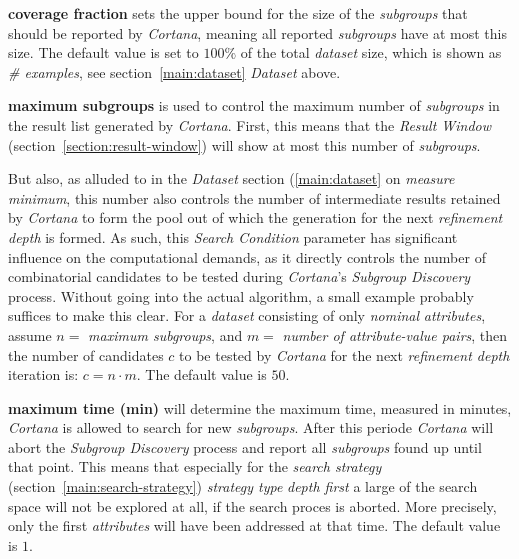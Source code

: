 \documentclass{article}
\begin{document}
\textbf{coverage fraction} sets the upper bound for the size of the \emph{subgroups} that should be reported by \emph{Cortana}, meaning all reported \emph{subgroups} have at most this size.
The default value is set to $100\%$ of the total \emph{dataset} size, which is shown as \emph{\# examples}, see section~\ref{main:dataset} \emph{Dataset} above.

\textbf{maximum subgroups} is used to control the maximum number of \emph{subgroups} in the result list generated by \emph{Cortana}.
First, this means that the \emph{Result Window} (section~\ref{section:result-window}) will show at most this number of \emph{subgroups}.

But also, as alluded to in the \emph{Dataset} section (\ref{main:dataset} on \emph{measure minimum}, this number also controls the number of intermediate results retained by \emph{Cortana} to form the pool out of which the generation for the next \emph{refinement depth} is formed.
As such, this \emph{Search Condition} parameter has significant influence on the computational demands, as it directly controls the number of combinatorial candidates to be tested during \emph{Cortana}'s \emph{Subgroup Discovery} process.
Without going into the actual algorithm, a small example probably suffices to make this clear.
For a \emph{dataset} consisting of only \emph{nominal} \emph{attributes}, assume $n =$ \emph{maximum subgroups}, and $m =$ \emph{number of attribute-value pairs}, then the number of candidates $c$ to be tested by \emph{Cortana} for the next \emph{refinement depth} iteration is: $c = n \cdot m$.
The default value is $50$.

\textbf{maximum time (min)} will determine the maximum time, measured in minutes, \emph{Cortana} is allowed to search for new \emph{subgroups}.
After this periode \emph{Cortana} will abort the \emph{Subgroup Discovery} process and report all \emph{subgroups} found up until that point.
This means that especially for the \emph{search strategy} (section~\ref{main:search-strategy}) \emph{strategy type} \emph{depth first} a large of the search space will not be explored at all, if the search proces is aborted.
More precisely, only the first \emph{attributes} will have been addressed at that time.
The default value is $1$.
\end{document}
